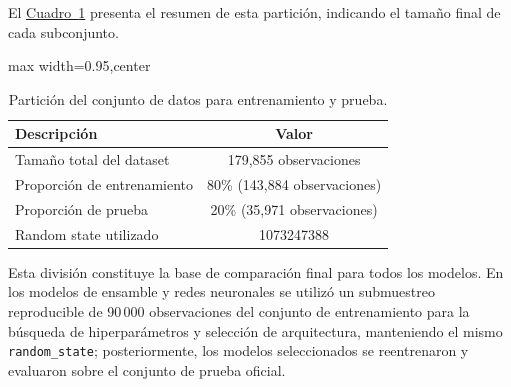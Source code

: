 \documentclass[10pt]{article}
\newcommand{\cuadroref}[1]{\hyperref[#1]{Cuadro~\ref*{#1}}}
\begin{document}
	El \cuadroref{tab:particion_dataset} presenta el resumen de esta partición, indicando el tamaño final de cada subconjunto.

	\begin{table}[!htbp]
		\centering
		\caption{Partición del conjunto de datos para entrenamiento y prueba.}
		\label{tab:particion_dataset}
		\begin{adjustbox}{max width=0.95\textwidth,center}
			\begin{tabular}{lc}
				\hline
				\textbf{Descripción} & \textbf{Valor} \\
				\hline
				Tamaño total del dataset & 179{,}855 observaciones \\
				Proporción de entrenamiento & 80\% (143{,}884 observaciones) \\
				Proporción de prueba & 20\% (35{,}971 observaciones) \\
				Random state utilizado & 1073247388 \\
				\hline
			\end{tabular}
		\end{adjustbox}
	\end{table}

	Esta división constituye la base de comparación final para todos los modelos. En los modelos de ensamble y redes neuronales se utilizó un submuestreo reproducible de 90\,000 observaciones del conjunto de entrenamiento para la búsqueda de hiperparámetros y selección de arquitectura, manteniendo el mismo \texttt{random\_state}; posteriormente, los modelos seleccionados se reentrenaron y evaluaron sobre el conjunto de prueba oficial.
\end{document}
